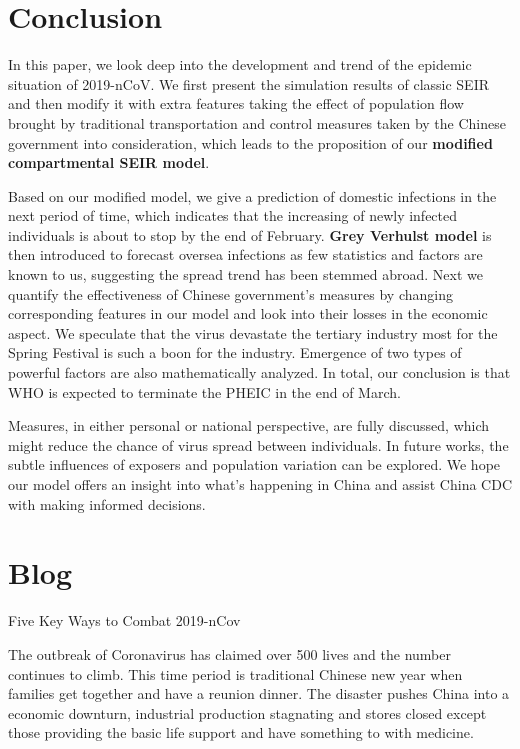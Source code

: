 \documentclass[12pt]{mcmthesis}
\begin{document}
\section{Conclusion}
In this paper, we look deep into the development and trend of the epidemic situation of 2019-nCoV. We first present the simulation results of classic SEIR and then modify it with extra features taking the effect of population flow brought by traditional transportation and control measures taken by the Chinese government into consideration, which leads to the proposition of our \textbf{modified compartmental SEIR model}.

Based on our modified model, we give a prediction of domestic infections in the next period of time, which indicates that the increasing of newly infected individuals is about to stop by the end of February. \textbf{Grey Verhulst model} is then introduced to forecast oversea infections as few statistics and factors are known to us, suggesting the spread trend has been stemmed abroad. Next we quantify the effectiveness of Chinese government's measures by changing corresponding features in our model and look into their losses in the economic aspect. We speculate that the virus devastate the tertiary industry most for the Spring Festival is such a boon for the industry. Emergence of two types of powerful factors are also mathematically analyzed. In total, our conclusion is that WHO is expected to terminate the PHEIC in the end of March.

Measures, in either personal or national perspective, are fully discussed, which might reduce the chance of virus spread between individuals. In future works, the subtle influences of exposers and population variation can be explored. We hope our model offers an insight into what's happening in China and assist China CDC with making informed decisions. 
\newpage

\section{Blog}

\centerline{\Large{Five Key Ways to Combat 2019-nCov}}

The outbreak of Coronavirus has claimed over 500 lives and the number continues to climb. This time period is traditional Chinese new year when families get together and have a reunion dinner. The disaster pushes China into a economic downturn, industrial production stagnating and stores closed except those providing the basic life support and have something to with medicine.
\end{document}
